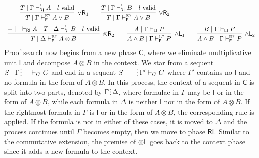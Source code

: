 \documentclass[submission,copyright,creativecommons]{eptcs}
\theoremstyle{definition}
\newcommand{\tl}{\otimes \mathsf{L}}
\newcommand{\tr}{\otimes \mathsf{R}}
\newcommand{\andlone}{\land \mathsf{L_{1}}}
\newcommand{\andltwo}{\land \mathsf{L_{2}}}
\newcommand{\orrone}{\lor \mathsf{R_{1}}}
\newcommand{\orrtwo}{\lor \mathsf{R_{2}}}
\newcommand{\ot}{\otimes}
\newcommand{\I}{\mathsf{I}}
\newcommand{\C}{\mathsf{C}}
\newcommand{\RI}{\mathsf{RI}}
\newcommand{\LI}{\mathsf{LI}}
\newcommand{\F}{\mathsf{F}}
\newcommand{\tL}{\mathbb{L}}
\newcommand{\tR}{\mathbb{R}}
\newcommand{\tE}{\mathbb{E}}
\newcommand{\spl}{\raisebox{-1.5pt}[0.5\height]{\hspace{1pt}\vdots\hspace{1pt}}}
\begin{document}
\begin{equation}
\begin{array}{lc}
{    \qquad
    \infer[\orrone]{T \mid \Gamma \vdash^{\tE?}_{\F} A \lor B}{
      T \mid \Gamma \vdash^{l}_{\RI} A
      &
      l \ \text{valid}
    }
    \qquad
    \infer[\orrtwo]{T \mid \Gamma \vdash^{\tE?}_{\F} A \lor B}{
      T \mid \Gamma \vdash^{l}_{\RI} B
      &
      l \ \text{valid}
    }
    }
    \\[6pt]
    \multicolumn{2}{c}{
    \infer[\tr_{2}]{T \mid \Delta \vdash^{\tE?}_{\F} A \ot B}{
      - \mid \quad \vdash_{\RI} A
      &
      T \mid \Delta \vdash^{l}_{\RI} B
      &
      l \ \text{valid}
    }
    \qquad
    \infer[\andlone]{A \land B \mid \Gamma \vdash^{\tL?}_{\F} P}{A \mid \Gamma \vdash_{\LI} P}
    \qquad
    \infer[\andltwo]{A \land B \mid \Gamma \vdash^{\tR?}_{\F} P}{B \mid \Gamma \vdash_{\LI} P}
    }
  \end{array}
\end{equation}
Proof search now begins from a new phase $\C$, where we eliminate multiplicative unit $\I$ and decompose $A \ot B$ in the context.
We star from a sequent $S \mid \Gamma \spl \quad \vdash_{C} C$ and end in a sequent $S \mid \quad \spl \Gamma' \vdash_{C} C$ where $\Gamma'$ contains no $\I$ and no formula in the form of $A \ot B$.
In this process, the context of a sequent in $\C$ is split into two parts, denoted by $\Gamma \spl \Delta$, where formulae in $\Gamma$ may be $\I$ or in the form of $A \ot B$, while each formula in $\Delta$ is neither $\I$ nor in the form of $A \ot B$.
If the rightmost formula in $\Gamma$ is $\I$ or in the form of $A \ot B$, the corresponding rule is applied.
If the formula is not in either of these cases, it is moved to $\Delta$ and the process continues until $\Gamma$ becomes empty, then we move to phase $\RI$.
Similar to the commutative extension, the premise of $\tl$ goes back to the context phase since it adds a new formula to the context.
\end{document}
